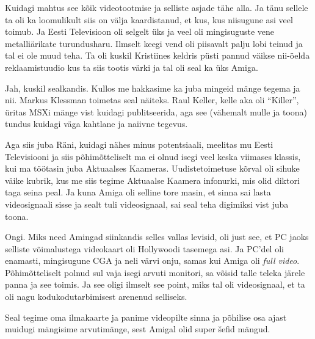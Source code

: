 Kuidagi mahtus see kõik videotootmise ja selliste asjade tähe alla. Ja tänu sellele ta oli ka loomulikult siis on välja kaardistanud, et kus, kus niisugune asi veel toimub. Ja Eesti Televisioon oli selgelt üks ja veel oli mingisuguste vene metalliärikate turundusharu. Ilmselt keegi vend oli piisavalt palju lobi teinud ja tal ei ole muud teha. Ta oli kuskil Kristiines  keldris püsti pannud väikse nii-öelda reklaamistuudio kus ta siis tootis värki ja tal oli seal ka üks Amiga. 


Jah, kuskil sealkandis. Kullos me hakkasime ka juba mingeid mänge tegema ja nii. Markus Klessman toimetas seal näiteks. Raul Keller, kelle aka oli \enquote{Killer}, üritas MSXi mänge vist kuidagi publitseerida, aga see (vähemalt mulle ja toona) tundus kuidagi väga kahtlane ja naiivne tegevus.

Aga siis juba Räni, kuidagi nähes minus potentsiaali, meelitas mu Eesti Televisiooni ja siis põhimõtteliselt ma ei olnud isegi veel keska viimases klassis, kui ma töötasin juba Aktuaalses Kaameras. Uudistetoimetuse kõrval oli sihuke väike kubrik, kus me siis tegime Aktuaalse Kaamera infonurki, mis olid  diktori taga seina peal. Ja kuna Amiga oli selline tore masin, et  sinna sai lasta videosignaali sisse ja sealt tuli videosignaal, sai seal teha digimiksi vist juba toona. 


Ongi. Miks need Amingad siinkandis selles vallas levisid, oli just see, et PC jaoks selliste võimalustega videokaart oli Hollywoodi tasemega asi. Ja PC'del oli enamasti, mingisugune CGA ja neli värvi onju, samas kui Amiga oli \emph{full video}. Põhimõtteliselt polnud sul vaja isegi arvuti monitori, sa võisid talle teleka järele panna ja see toimis. Ja see oligi ilmselt see point, miks tal oli videosignaal, et ta oli nagu kodukodutarbimisest arenenud selliseks. 

Seal tegime oma ilmakaarte ja panime videopilte sinna ja põhilise osa ajast muidugi mängisime arvutimänge, sest  Amigal olid super šefid mängud. 


